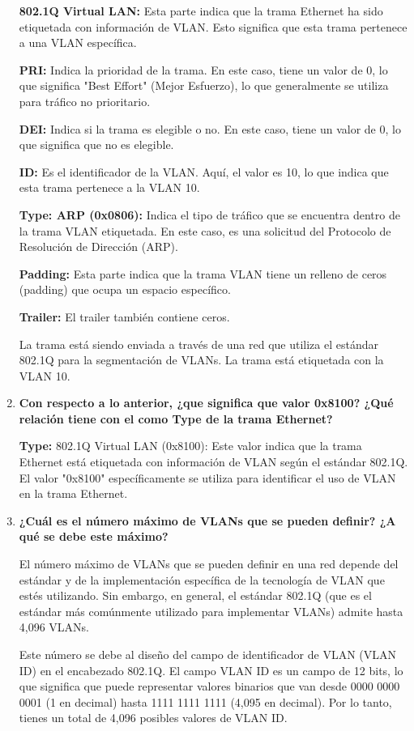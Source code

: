 \documentclass[a4paper]{article}
\begin{document}
\begin{enumerate}
	\textbf{802.1Q Virtual LAN:} Esta parte indica que la trama Ethernet ha sido etiquetada con información de VLAN. Esto significa que esta trama pertenece a una VLAN específica.
	
	\textbf{PRI:} Indica la prioridad de la trama. En este caso, tiene un valor de 0, lo que significa "Best Effort" (Mejor Esfuerzo), lo que generalmente se utiliza para tráfico no prioritario.
	
	\textbf{DEI:} Indica si la trama es elegible o no. En este caso, tiene un valor de 0, lo que significa que no es elegible.
	
	\textbf{ID:} Es el identificador de la VLAN. Aquí, el valor es 10, lo que indica que esta trama pertenece a la VLAN 10.
	
	\textbf{Type: ARP (0x0806):} Indica el tipo de tráfico que se encuentra dentro de la trama VLAN etiquetada. En este caso, es una solicitud del Protocolo de Resolución de Dirección (ARP).
	
	\textbf{Padding:} Esta parte indica que la trama VLAN tiene un relleno de ceros (padding) que ocupa un espacio específico. 
	
	\textbf{Trailer:} El trailer también contiene ceros.
	
	La trama está siendo enviada a través de una red que utiliza el estándar 802.1Q para la segmentación de VLANs. La trama está etiquetada con la VLAN 10.
	
	\item \textbf{Con respecto a lo anterior, ¿que significa que valor 0x8100? ¿Qué relación tiene con el como Type de la trama Ethernet?}
	
	\textbf{Type:} 802.1Q Virtual LAN (0x8100): Este valor indica que la trama Ethernet está etiquetada con información de VLAN según el estándar 802.1Q. El valor "0x8100" específicamente se utiliza para identificar el uso de VLAN en la trama Ethernet.
	
  \item \textbf{¿Cuál es el número máximo de VLANs que se pueden definir? ¿A qué se debe este máximo?}


El número máximo de VLANs que se pueden definir en una red depende del estándar y de la implementación específica de la tecnología de VLAN que estés utilizando. Sin embargo, en general, el estándar 802.1Q (que es el estándar más comúnmente utilizado para implementar VLANs) admite hasta 4,096 VLANs.

Este número se debe al diseño del campo de identificador de VLAN (VLAN ID) en el encabezado 802.1Q. El campo VLAN ID es un campo de 12 bits, lo que significa que puede representar valores binarios que van desde 0000 0000 0001 (1 en decimal) hasta 1111 1111 1111 (4,095 en decimal). Por lo tanto, tienes un total de 4,096 posibles valores de VLAN ID.


\end{enumerate}
\end{document}

